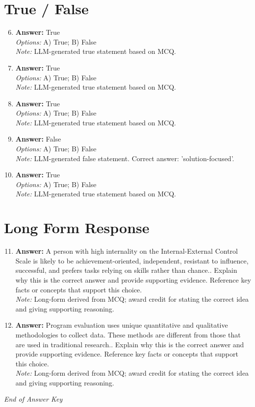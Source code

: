 \documentclass[12pt]{article}
\begin{document}
\section*{True / False}
\begin{enumerate}[label=\arabic*.]
\setcounter{enumi}{5}
\item \textbf{Answer:} True
\\ \textit{Options:} A) True; B) False
\\ \textit{Note:} LLM-generated true statement based on MCQ.
\item \textbf{Answer:} True
\\ \textit{Options:} A) True; B) False
\\ \textit{Note:} LLM-generated true statement based on MCQ.
\item \textbf{Answer:} True
\\ \textit{Options:} A) True; B) False
\\ \textit{Note:} LLM-generated true statement based on MCQ.
\item \textbf{Answer:} False
\\ \textit{Options:} A) True; B) False
\\ \textit{Note:} LLM-generated false statement. Correct answer: 'solution-focused'.
\item \textbf{Answer:} True
\\ \textit{Options:} A) True; B) False
\\ \textit{Note:} LLM-generated true statement based on MCQ.
\end{enumerate}

\section*{Long Form Response}
\begin{enumerate}[label=\arabic*.]
\setcounter{enumi}{10}
\item \textbf{Answer:} A person with high internality on the Internal-External Control Scale is likely to be achievement-oriented, independent, resistant to influence, successful, and prefers tasks relying on skills rather than chance.. Explain why this is the correct answer and provide supporting evidence. Reference key facts or concepts that support this choice.
\\ \textit{Note:} Long-form derived from MCQ; award credit for stating the correct idea and giving supporting reasoning.
\item \textbf{Answer:} Program evaluation uses unique quantitative and qualitative methodologies to collect data. These methods are different from those that are used in traditional research.. Explain why this is the correct answer and provide supporting evidence. Reference key facts or concepts that support this choice.
\\ \textit{Note:} Long-form derived from MCQ; award credit for stating the correct idea and giving supporting reasoning.
\end{enumerate}

\vfill
\noindent\textit{End of Answer Key}
\end{document}
